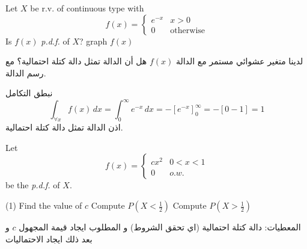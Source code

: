 \begin{example}
	\begin{english}
		Let $X$ be r.v. of continuous type with
		\[
		f(x) = \begin{cases}
			e^{-x} & x> 0 \\
			0 & \text{otherwise}
		\end{cases}
		\]
		Is $f(x)$ \textit{p.d.f.} of $X$? graph $f(x)$
	\end{english}
	
	\noindent
	لدينا متغير عشوائي مستمر مع الدالة $f(x)$ هل أن الدالة تمثل دالة كتلة احتمالية؟ مع رسم الدالة.
\end{example}
\begin{solution}
	نبطق التكامل 
	\[
	\int_{\forall x} f(x) \, dx = \int_0^\infty e^{-x} \, dx  = - [e^{-x}]^\infty_0 = - [0-1] = 1
	\]
	اذن الدالة تمثل دالة كتلة احتمالية.
			\begin{figure}[H]
			\centering
		\end{figure}
\end{solution}

\begin{example}
	\begin{english}
		Let
		\[
		f(x) = \begin{cases}
			cx^2 & 0<x<1 \\
			0 & o.w.
		\end{cases}
		\]
		be the \textit{p.d.f.} of $X$.
		\begin{tasks}(1)
			\task Find the value of $c$
			\task Compute $P(X<\frac{1}{2})$
			\task Compute $P(X>\frac{1}{2})$
		\end{tasks}
	\end{english}
	
	\noindent
	المعطيات: دالة كتلة احتمالية (اي تحقق الشروط) و المطلوب ايجاد قيمة المجهول $c$ و بعد ذلك ايجاد الاحتماليات
\end{example}

